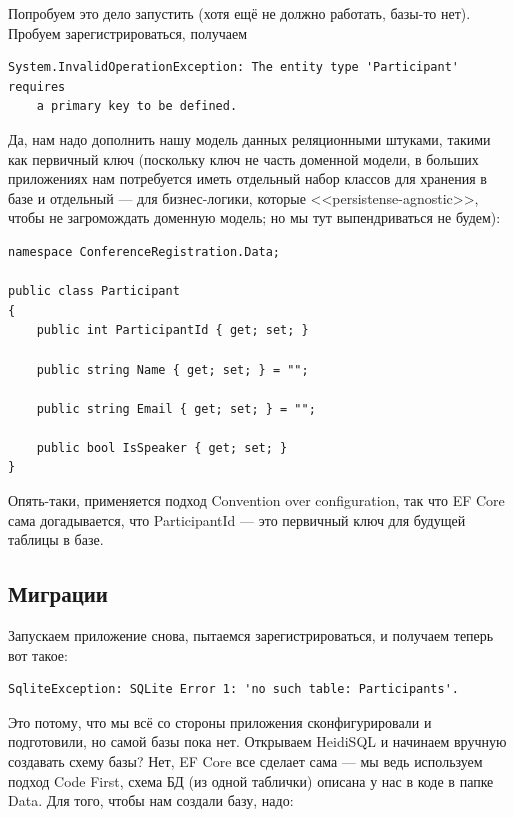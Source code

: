 \documentclass[a5paper]{article}
\begin{document}
Попробуем это дело запустить (хотя ещё не должно работать, базы-то нет). Пробуем зарегистрироваться, получаем 

\begin{verbatim}
System.InvalidOperationException: The entity type 'Participant' requires 
    a primary key to be defined.
\end{verbatim}

Да, нам надо дополнить нашу модель данных реляционными штуками, такими как первичный ключ (поскольку ключ не часть доменной модели, в больших приложениях нам потребуется иметь отдельный набор классов для хранения в базе и отдельный --- для бизнес-логики, которые <<persistense-agnostic>>, чтобы не загромождать доменную модель; но мы тут выпендриваться не будем):

\begin{verbatim}
namespace ConferenceRegistration.Data;

public class Participant
{
    public int ParticipantId { get; set; }

    public string Name { get; set; } = "";

    public string Email { get; set; } = "";

    public bool IsSpeaker { get; set; }
}
\end{verbatim}

Опять-таки, применяется подход Convention over configuration, так что EF Core сама догадывается, что ParticipantId --- это первичный ключ для будущей таблицы в базе.

\subsection{Миграции}

Запускаем приложение снова, пытаемся зарегистрироваться, и получаем теперь вот такое:

\begin{verbatim}
SqliteException: SQLite Error 1: 'no such table: Participants'.
\end{verbatim}

Это потому, что мы всё со стороны приложения сконфигурировали и подготовили, но самой базы пока нет. Открываем HeidiSQL и начинаем вручную создавать схему базы? Нет, EF Core все сделает сама --- мы ведь используем подход Code First, схема БД (из одной таблички) описана у нас в коде в папке Data. Для того, чтобы нам создали базу, надо:
\end{document}
